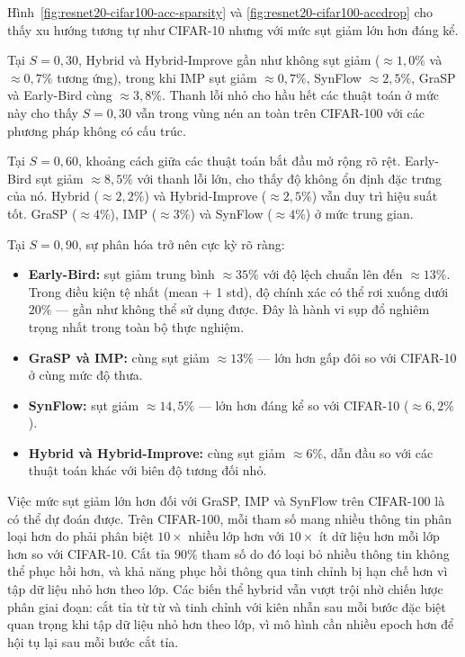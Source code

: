 Hình~\ref{fig:resnet20-cifar100-acc-sparsity} và \ref{fig:resnet20-cifar100-accdrop} cho thấy xu hướng tương tự như
CIFAR-10 nhưng với mức sụt giảm lớn hơn đáng kể.
 
Tại $S=0{,}30$, Hybrid và Hybrid-Improve gần như không sụt giảm ($\approx1{,}0\%$ và
$\approx0{,}7\%$ tương ứng), trong khi IMP sụt giảm $\approx0{,}7\%$, SynFlow $\approx2{,}5\%$,
GraSP và Early-Bird cùng $\approx3{,}8\%$.
Thanh lỗi nhỏ cho hầu hết các thuật toán ở mức này cho thấy $S=0{,}30$ vẫn trong vùng
nén an toàn trên CIFAR-100 với các phương pháp không có cấu trúc.
 
Tại $S=0{,}60$, khoảng cách giữa các thuật toán bắt đầu mở rộng rõ rệt.
Early-Bird sụt giảm $\approx8{,}5\%$ với thanh lỗi lớn, cho thấy độ không ổn định đặc
trưng của nó.
Hybrid ($\approx2{,}2\%$) và Hybrid-Improve ($\approx2{,}5\%$) vẫn duy trì hiệu suất tốt.
GraSP ($\approx4\%$), IMP ($\approx3\%$) và SynFlow ($\approx4\%$) ở mức trung gian.
 
Tại $S=0{,}90$, sự phân hóa trở nên cực kỳ rõ ràng:
\begin{itemize}
    \item \textbf{Early-Bird:} sụt giảm trung bình $\approx35\%$ với độ lệch chuẩn lên
    đến $\approx13\%$. Trong điều kiện tệ nhất (mean + 1 std), độ chính xác có thể rơi
    xuống dưới $20\%$ --- gần như không thể sử dụng được. Đây là hành vi sụp đổ nghiêm
    trọng nhất trong toàn bộ thực nghiệm.
    \item \textbf{GraSP và IMP:} cùng sụt giảm $\approx13\%$ --- lớn hơn gấp đôi so với
    CIFAR-10 ở cùng mức độ thưa.
    \item \textbf{SynFlow:} sụt giảm $\approx14{,}5\%$ --- lớn hơn đáng kể so với CIFAR-10
    ($\approx6{,}2\%$).
    \item \textbf{Hybrid và Hybrid-Improve:} cùng sụt giảm $\approx6\%$, dẫn đầu so với các
    thuật toán khác với biên độ tương đối nhỏ.
\end{itemize}
 
Việc mức sụt giảm lớn hơn đối với GraSP, IMP và SynFlow trên CIFAR-100 là có thể dự đoán được.
Trên CIFAR-100, mỗi tham số mang nhiều thông tin phân loại hơn
do phải phân biệt $10\times$ nhiều lớp hơn với $10\times$ ít dữ liệu hơn mỗi lớp hơn so với CIFAR-10.
Cắt tỉa $90\%$ tham số do đó loại bỏ nhiều thông tin không thể phục hồi hơn, và khả năng
phục hồi thông qua tinh chỉnh bị hạn chế hơn vì tập dữ liệu nhỏ hơn theo lớp.
Các biến thể hybrid vẫn vượt trội nhờ chiến lược phân giai đoạn: cắt tỉa từ từ và tinh
chỉnh với kiên nhẫn sau mỗi bước đặc biệt quan trọng khi tập dữ liệu nhỏ hơn theo lớp,
vì mô hình cần nhiều epoch hơn để hội tụ lại sau mỗi bước cắt tỉa.
 
